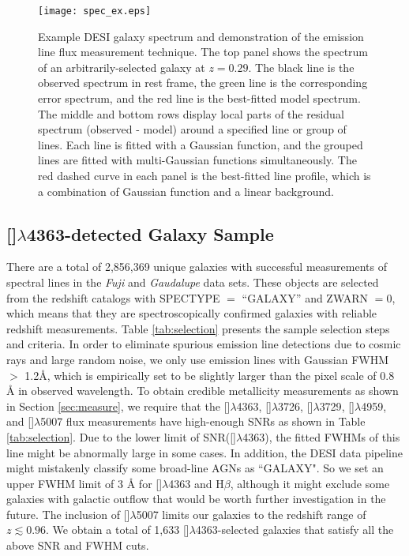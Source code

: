 \documentclass[twocolumn]{aastex631}
\newcommand{\Hb}{\mbox{H$\beta$}}       %
\newcommand{\OIIIFIZ}{[\mbox{\ion{O}{3}}]$\lambda$5007}
\newcommand{\OIIIFON}{[\mbox{\ion{O}{3}}]$\lambda$4959}
\newcommand{\OIIIFOT}{[\mbox{\ion{O}{3}}]$\lambda$4363}
\newcommand{\OIITS}{[\mbox{\ion{O}{2}}]$\lambda$3726}
\newcommand{\OIITN}{[\mbox{\ion{O}{2}}]$\lambda$3729}
\newcommand{\boldtext}[1]{\textcolor[rgb]{0,0,0}{#1}}
\begin{document}
\begin{figure*}[ht!]
\centering
\texttt{[image: spec\_ex.eps]}
\caption{Example DESI galaxy spectrum and demonstration of the emission line flux measurement technique. The top panel shows the spectrum of an arbitrarily-selected galaxy at $z=0.29$. The black line is the observed spectrum in rest frame, the green line is the corresponding error spectrum, and the red line is the best-fitted model spectrum. The middle and bottom rows display local parts of the residual spectrum (observed - model) around a specified line or group of lines. Each line is fitted with a Gaussian function, and the grouped lines are fitted with multi-Gaussian functions simultaneously. The red dashed curve in each panel is the best-fitted line profile, which is a combination of Gaussian function and a linear background.   \label{fig:spec}}
\end{figure*}

\subsection{{\OIIIFOT}-detected Galaxy Sample}
There are a total of 2,856,369 unique galaxies with successful measurements of spectral lines in the \textit{Fuji} and \textit{Gaudalupe} data sets. These objects are selected from the redshift catalogs with SPECTYPE $=$ ``GALAXY'' and ZWARN $= 0$, which means that they are spectroscopically confirmed galaxies with reliable redshift measurements. Table \ref{tab:selection} presents the sample selection steps and criteria. \boldtext{In order to eliminate spurious emission line detections due to cosmic rays and large random noise, we only use emission lines with Gaussian FWHM $>$ 1.2\AA, which is empirically set to be slightly larger than the pixel scale of 0.8 {\AA} in observed wavelength.} To obtain credible metallicity measurements as shown in Section \ref{sec:measure}, we require that the {\OIIIFOT}, {\OIITS}, {\OIITN}, {\OIIIFON}, and {\OIIIFIZ} flux measurements have high-enough SNRs as shown in Table \ref{tab:selection}. Due to the lower limit of SNR(\OIIIFOT), the fitted FWHMs of this line might be abnormally large in some cases. In addition, the DESI data pipeline might mistakenly classify some broad-line AGNs as ``GALAXY". So we set an upper FWHM limit of 3 {\AA} for {\OIIIFOT} and \Hb, although it might exclude some galaxies with galactic outflow that would be worth further investigation in the future. The inclusion of {\OIIIFIZ} limits our galaxies to the redshift range of $z \lesssim 0.96$. We obtain a total of 1,633 {\OIIIFOT}-selected galaxies that satisfy all the above SNR and FWHM cuts.
\end{document}
